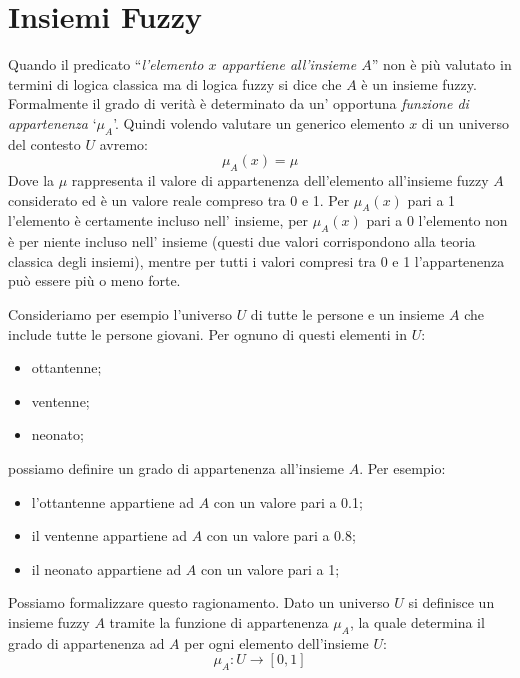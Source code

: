 \documentclass[a4paper,12pt]{report}
\begin{document}
\section{Insiemi Fuzzy}
Quando il predicato ``\textit{l'elemento $x$ appartiene all'insieme $A$}'' non è  più valutato in termini di logica classica ma di logica fuzzy si dice che $A$ è un insieme fuzzy. 
Formalmente il grado di verità è determinato da un' opportuna \textit{funzione di appartenenza} `$\mu_A$'. Quindi volendo valutare un generico elemento $x$ di un universo del contesto $U$ avremo:
\begin{equation*}
    \mu_A(x) = \mu
\end{equation*}
\noindent 
Dove la $\mu$ rappresenta il valore di appartenenza dell'elemento all'insieme fuzzy $A$ considerato ed è un valore reale compreso tra 0 e 1. 
Per $\mu_A(x)$ pari a 1 l’elemento è certamente incluso nell’ insieme, per $\mu_A(x)$ pari a 0
l’elemento non è per niente incluso nell’ insieme (questi due valori corrispondono alla teoria classica degli insiemi), mentre per tutti i valori compresi tra 0 e 1 l’appartenenza può essere più o meno forte.

\bigskip

Consideriamo per esempio l'universo $U$ di tutte le persone e un insieme $A$ che include tutte le persone giovani. Per ognuno di questi elementi in $U$:
\begin{itemize}
    \item ottantenne;
    \item ventenne;
    \item neonato;
\end{itemize}
possiamo definire un grado di appartenenza all'insieme $A$. Per esempio:
\begin{itemize}
    \item l'ottantenne appartiene ad $A$ con un valore pari a 0.1;
    \item il ventenne appartiene ad $A$ con un valore pari a 0.8;
    \item il neonato appartiene ad $A$ con un valore pari a 1;
\end{itemize}
Possiamo formalizzare questo ragionamento.
Dato un universo $U$ si definisce un insieme fuzzy $A$ tramite la funzione di appartenenza $\mu_A$, la quale determina il grado di appartenenza ad $A$ per ogni elemento dell'insieme $U$:
\begin{equation*}
    \mu_A : U \to [0,1]
\end{equation*}
\end{document}
